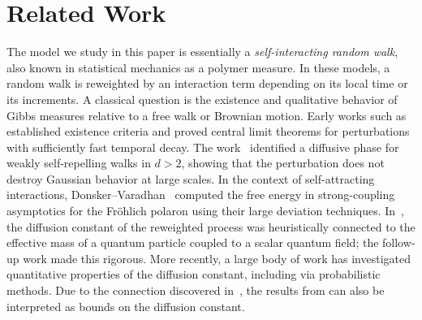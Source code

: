 \documentclass[reqno,11pt]{amsart}
\newcommand{\1}{\mathds{1}}
\theoremstyle{plain}
\theoremstyle{definition}
\numberwithin{equation}{section}
\begin{document}
\section{Related Work}
The model we study in this paper is essentially a \emph{self-interacting random walk}, also known in statistical mechanics as a polymer measure. In these models, a random walk is reweighted by an interaction term depending on its local time or its increments. A classical question is the existence and qualitative behavior of Gibbs measures relative to a free walk or Brownian motion. Early works such as \cite{Betz2003,BeSp05} established existence criteria and proved central limit theorems for perturbations with sufficiently fast temporal decay. The work~\cite{BrySla95} identified a diffusive phase for weakly self-repelling walks in $d>2$, showing that the perturbation does not destroy Gaussian behavior at large scales. In the context of self-attracting interactions, Donsker--Varadhan~\cite{Donsker1983} computed the free energy in strong-coupling asymptotics for the Fröhlich polaron using their large deviation techniques. In~\cite{Sp87}, the diffusion constant of the reweighted process was heuristically connected to the effective mass of a quantum particle coupled to a scalar quantum field; the follow-up work \cite{DySp20} made this rigorous. More recently, a large body of work has investigated quantitative properties of the diffusion constant, including \cite{BePo23,Se24,BeSchSe25,BeSchSe25b,BaMuSeVa23} via probabilistic methods. Due to the connection discovered in~\cite{Sp87}, the results from \cite{BrSe24,Br24} can also be interpreted as bounds on the diffusion constant.
\end{document}
